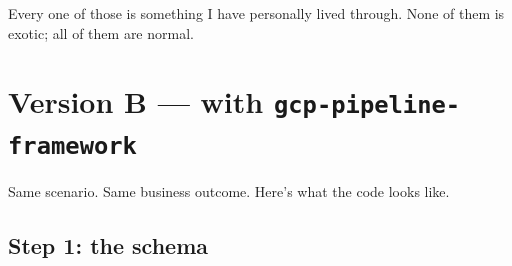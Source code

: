 \documentclass[
  11pt,
  british,
  oneside]{book}
\begin{document}
Every one of those is something I have personally lived through. None of
them is exotic; all of them are normal.

\hypertarget{version-b-with-gcp-pipeline-framework}{%
\section{\texorpdfstring{Version B --- with
\texttt{gcp-pipeline-framework}}{Version B --- with gcp-pipeline-framework}}\label{version-b-with-gcp-pipeline-framework}}

Same scenario. Same business outcome. Here's what the code looks like.

\hypertarget{step-1-the-schema}{%
\subsection{Step 1: the schema}\label{step-1-the-schema}}
\end{document}
